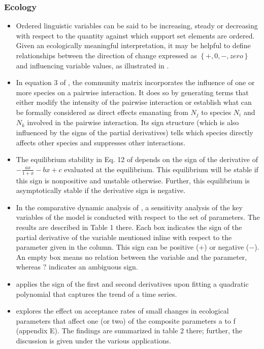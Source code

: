 \documentclass[11pt]{book}
\begin{document}
\subsubsection{Ecology}
\begin{itemize}
\item Ordered linguistic variables can be said to be increasing, steady
or decreasing with respect to the quantity against which support set
elements are ordered. Given an ecologically meaningful interpretation,
it may be helpful to define relationships between the direction of
change expressed as $\left\{ +,0,-,zero\right\} $ and influencing
variable values, as illustrated in \cite{mcintosh2003qualitative}.
\item In equation 3 of \cite{dambacher2007understanding},
the community matrix incorporates the influence of one or more species
on a pairwise interaction. It does so by generating terms that either
modify the intensity of the pairwise interaction or establish what
can be formally considered as direct effects emanating from $N_{j}$
to species $N_{i}$ and $N_{k}$ involved in the pairwise interaction.
Its sign structure (which is also influenced by the signs of the partial
derivatives) tells which species directly affects other species and
suppresses other interactions.
\item The equilibrium stability in Eq. 12 of \cite{prasad2014dynamics}
depends on the sign of the derivative of $-\frac{ax}{1+x}-bx+c$ evaluated
at the equilibrium. This equilibrium will be stable if this sign is
nonpositive and unstable otherwise. Further, this equilibrium is asymptotically
stable if the derivative sign is negative.
\item In the comparative dynamic analysis of \cite{lafforgue2019dynamic},
a sensitivity analysis of the key variables of the model is conducted
with respect to the set of parameters. The results are described in
Table 1 there. Each box indicates the sign of the partial derivative
of the variable mentioned inline with respect to the parameter given
in the column. This sign can be positive (\textquotedbl$+$\textquotedbl )
or negative (\textquotedbl$-$\textquotedbl ). An empty box means
no relation between the variable and the parameter, whereas \textquotedbl$?$\textquotedbl{}
indicates an ambiguous sign.
\item \cite{rigal2020method}
applies the sign of the first and second derivatives upon fitting
a quadratic polynomial that captures the trend of a time series.
\item \cite{holen2021coping}
explores the effect on acceptance rates of small changes in ecological
parameters that affect one (or two) of the composite parameters a
to f (appendix E). The findings are summarized in table 2 there; further,
the discussion is given under the various applications.
\end{itemize}
\end{document}
